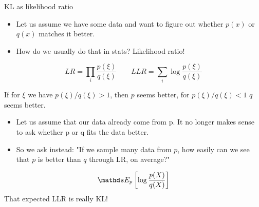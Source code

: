 \documentclass[11pt,compress,t,notes=noshow, xcolor=table]{beamer}
\begin{document}
\begin{vbframe}{KL as likelihood ratio}

\begin{itemize}
\item Let us assume we have some data and want to figure out whether $p(x)$ or $q(x)$ matches it better.
\item How do we usually do that in stats? Likelihood ratio! 
\end{itemize}

$$ LR = \prod_i \frac{p(\xi)}{q(\xi)} \qquad LLR = \sum_i \log \frac{p(\xi)}{q(\xi)} $$
  
If for $\xi$ we have $p(\xi)/q(\xi)>1$, then $p$ seems better, for $p(\xi)/q(\xi) < 1$ $q$ seems better. \\
\begin{itemize}
    \item Let us assume that our data already come from p. It no longer makes sense to ask whether p or q fits the data better.
    \item So we ask instead: "If we sample many data from $p$, how easily can we see that $p$ is better than $q$ through LR, on average?"
\end{itemize}
$$ \E_p \left[\log \frac{p(X)}{q(X)}\right] $$
That expected LLR is really KL!

\end{vbframe}



  


\end{document}
